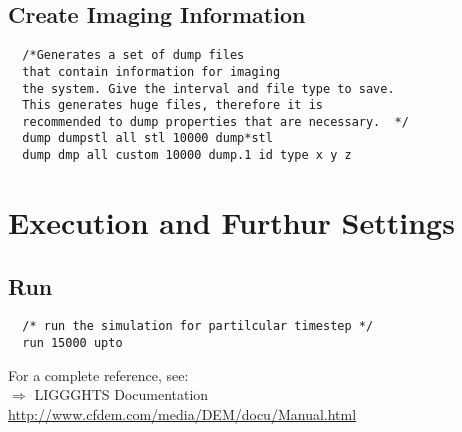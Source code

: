 \documentclass[8pt]{extarticle} %
\begin{document}
\begin{multicols}{3}
\subsection{Create Imaging Information}
\begin{verbatim}
  /*Generates a set of dump files
  that contain information for imaging
  the system. Give the interval and file type to save.
  This generates huge files, therefore it is
  recommended to dump properties that are necessary.  */
  dump dumpstl all stl 10000 dump*stl
  dump dmp all custom 10000 dump.1 id type x y z
\end{verbatim}

\section{Execution and Furthur Settings}


\subsection{Run}

\begin{verbatim}
  /* run the simulation for partilcular timestep */
  run 15000 upto
  \end{verbatim}

\vspace*{3ex}
\vfill

For a complete reference, see: \\
$\Rightarrow$
LIGGGHTS Documentation\\
\hspace*{1.2em}
\hspace*{1.2em} \url{http://www.cfdem.com/media/DEM/docu/Manual.html}


\end{multicols}
\end{document}
